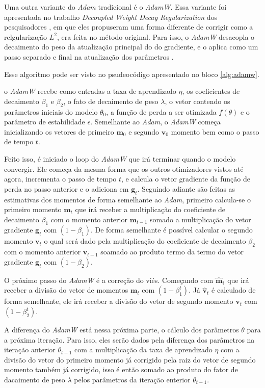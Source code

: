 Uma outra variante do \textit{Adam} tradicional é o \textit{AdamW}. Essa variante foi apresentada no trabalho \textit{Decoupled Weight Decay Regularization} dos pesquisadores \textcite{AdamWMethod}, em que eles propuseram uma forma diferente de corrigir como a relgularização $L^2$, era feita no método original. Para isso, o \textit{AdamW} desacopla o decaimento do peso da atualização principal do do gradiente, e o aplica como um passo separado e final na atualização dos parâmetros \parencite{AdamWMethod}.

Esse algoritmo pode ser visto no psudeocódigo apresentado no bloco \ref{alg:adamw}.

o \textit{AdamW} recebe como entradas a taxa de aprendizado $\eta$, os coeficientes de decaimento $\beta_1$ e $\beta_2$, o fato de decaimento de peso $\lambda$, o vetor contendo os parâmetros iniciais do modelo $\theta_0$, a função de perda a ser otimizada $f(\theta)$ e o parâmetro de estabilidade $\epsilon$. Semelhante ao \textit{Adam}, o \textit{AdamW} começa inicializando os vetores de primeiro $\mathbf{m}_0$ e segundo $\mathbf{v}_0$ momento bem como o passo de tempo $t$.

Feito isso, é iniciado o loop do \textit{AdamW} que irá terminar quando o modelo convergir. Ele começa da mesma forma que os outros otimizadores vistos até agora, incrementa o passo de tempo $t$, e calcula o vetor gradiente da função de perda no passo anterior e o adiciona em $\mathbf{g}_t$. Seguindo adiante são feitas as estimativas dos momentos de forma semelhante ao \textit{Adam}, primeiro calcula-se o primeiro momento $\mathbf{m}_t$ que irá receber a multiplicação do coeficiente de decaimento $\beta_1$ com o momento anterior $\mathbf{m}_{t-1}$ somado a multiplicação do vetor gradiente $\mathbf{g}_t$ com $(1 - \beta_1)$. De forma semelhante é possível calcular o segundo momento $\mathbf{v}_t$ o qual será dado pela multiplicação do coeficiente de decaimento $\beta_2$ com o momento anterior $\mathbf{v}_{t-1}$ soamado ao produto termo da termo do vetor gradiente $\mathbf{g}_t$ com $(1 - \beta_2)$.

O próximo passo do \textit{AdamW} é a correção do viés. Começando com $\mathbf{\hat{m}_t}$ que irá receber a divisão do vetor de momentos $\mathbf{m}_t$ com $(1 - \beta_1^t)$. Já $\mathbf{\hat{v}}_t$ é calculado de forma semelhante, ele irá receber a divisão do vetor de segundo momento $\mathbf{v}_t$ com $(1 - \beta_2^t)$.

A diferença do \textit{AdamW} está nessa próxima parte, o cálculo dos parâmetros $\theta$ para a próxima iteração. Para isso, eles serão dados pela diferença dos parâmetros na iteração anterior $\theta_{t-1}$ com a multiplicação da taxa de aprendizado $\eta$ com a divisão do vetor do primeiro momento já corrigido pela raiz do vetor de segundo momento também já corrigido, isso é então somado ao produto do fator de dacaimento de peso $\lambda$ pelos parâmetros da iteração enterior $\theta_{t-1}$.

